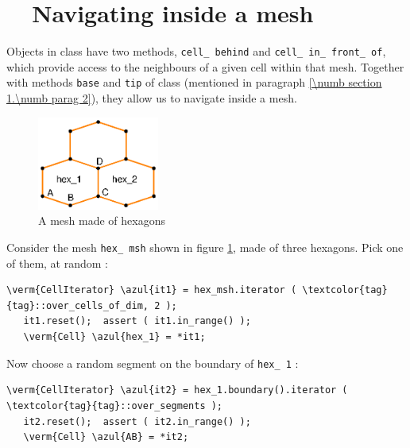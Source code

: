 \section{~~Navigating inside a mesh}\label{\numb section 9.\numb parag 6}

Objects in class {\small\tt {}} have two methods, {\small\tt cell\_\,behind} and
{\small\tt cell\_\,in\_\,front\_\,of},
which provide access to the neighbours of a given cell within that mesh.
Together with methods {\small\tt base} and {\small\tt tip} of class {\small\tt {}}
(mentioned in paragraph \ref{\numb section 1.\numb parag 2}), they allow us to navigate inside
a mesh.

\begin{figure}[ht] \centering
  \includegraphics[width=40mm]{malha-hex}
  \caption{A mesh made of hexagons}
  \label{\numb section 9.\numb fig 3}
\end{figure}

Consider the mesh {\small\tt hex\_\,msh} shown in figure \ref{\numb section 9.\numb fig 3},
made of three hexagons.
Pick one of them, at random :

\begin{Verbatim}[commandchars=\\\{\},formatcom=\small\tt,
   baselinestretch=0.94,framesep=2mm                      ]
   \verm{CellIterator} \azul{it1} = hex_msh.iterator ( \textcolor{tag}{tag}::over_cells_of_dim, 2 );
   it1.reset();  assert ( it1.in_range() );
   \verm{Cell} \azul{hex_1} = *it1;
\end{Verbatim}

Now choose a random segment on the boundary of {\small\tt hex\_\,1} :

\begin{Verbatim}[commandchars=\\\{\},formatcom=\small\tt,
   baselinestretch=0.94,framesep=2mm                      ]
   \verm{CellIterator} \azul{it2} = hex_1.boundary().iterator ( \textcolor{tag}{tag}::over_segments );
   it2.reset();  assert ( it2.in_range() );
   \verm{Cell} \azul{AB} = *it2;
\end{Verbatim}

